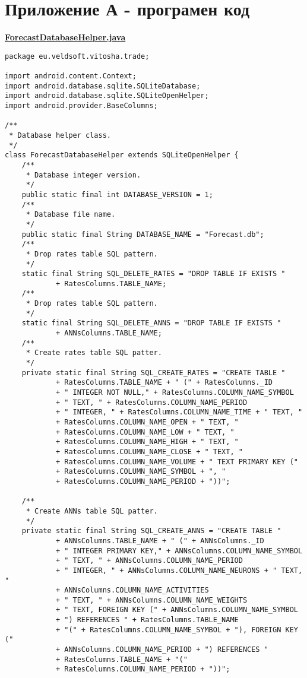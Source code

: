 \chapter*{Приложение А - програмен код}

\textbf{\underline{ForecastDatabaseHelper.java}}
\begin{verbatim}
package eu.veldsoft.vitosha.trade;

import android.content.Context;
import android.database.sqlite.SQLiteDatabase;
import android.database.sqlite.SQLiteOpenHelper;
import android.provider.BaseColumns;

/**
 * Database helper class.
 */
class ForecastDatabaseHelper extends SQLiteOpenHelper {
    /**
     * Database integer version.
     */
    public static final int DATABASE_VERSION = 1;
    /**
     * Database file name.
     */
    public static final String DATABASE_NAME = "Forecast.db";
    /**
     * Drop rates table SQL pattern.
     */
    static final String SQL_DELETE_RATES = "DROP TABLE IF EXISTS "
            + RatesColumns.TABLE_NAME;
    /**
     * Drop rates table SQL pattern.
     */
    static final String SQL_DELETE_ANNS = "DROP TABLE IF EXISTS "
            + ANNsColumns.TABLE_NAME;
    /**
     * Create rates table SQL patter.
     */
    private static final String SQL_CREATE_RATES = "CREATE TABLE "
            + RatesColumns.TABLE_NAME + " (" + RatesColumns._ID
            + " INTEGER NOT NULL," + RatesColumns.COLUMN_NAME_SYMBOL
            + " TEXT, " + RatesColumns.COLUMN_NAME_PERIOD
            + " INTEGER, " + RatesColumns.COLUMN_NAME_TIME + " TEXT, "
            + RatesColumns.COLUMN_NAME_OPEN + " TEXT, "
            + RatesColumns.COLUMN_NAME_LOW + " TEXT, "
            + RatesColumns.COLUMN_NAME_HIGH + " TEXT, "
            + RatesColumns.COLUMN_NAME_CLOSE + " TEXT, "
            + RatesColumns.COLUMN_NAME_VOLUME + " TEXT PRIMARY KEY ("
            + RatesColumns.COLUMN_NAME_SYMBOL + ", "
            + RatesColumns.COLUMN_NAME_PERIOD + "))";

    /**
     * Create ANNs table SQL patter.
     */
    private static final String SQL_CREATE_ANNS = "CREATE TABLE "
            + ANNsColumns.TABLE_NAME + " (" + ANNsColumns._ID
            + " INTEGER PRIMARY KEY," + ANNsColumns.COLUMN_NAME_SYMBOL
            + " TEXT, " + ANNsColumns.COLUMN_NAME_PERIOD
            + " INTEGER, " + ANNsColumns.COLUMN_NAME_NEURONS + " TEXT, "
            + ANNsColumns.COLUMN_NAME_ACTIVITIES
            + " TEXT, " + ANNsColumns.COLUMN_NAME_WEIGHTS
            + " TEXT, FOREIGN KEY (" + ANNsColumns.COLUMN_NAME_SYMBOL
            + ") REFERENCES " + RatesColumns.TABLE_NAME
            + "(" + RatesColumns.COLUMN_NAME_SYMBOL + "), FOREIGN KEY ("
            + ANNsColumns.COLUMN_NAME_PERIOD + ") REFERENCES "
            + RatesColumns.TABLE_NAME + "("
            + RatesColumns.COLUMN_NAME_PERIOD + "))";


\end{verbatim}
